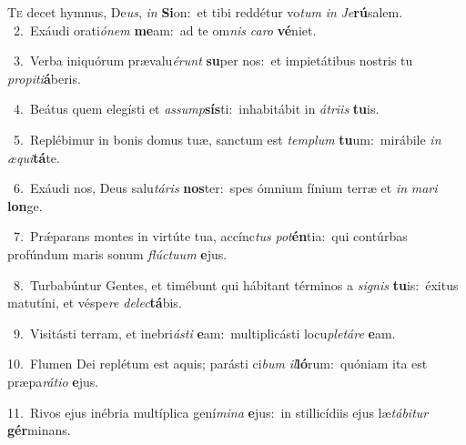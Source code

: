 \lettrine{\initial\textcolor{\initialcolor}{T}}{e} decet hymnus, De\-\textit{us}\-, \textit{in} \textbf{Si}\-on:~\star et tibi reddétur vo\textit{tum} \textit{in} \textit{Je}\-\textbf{rú}salem.\\
{\numbfont\textcolor{\numbcolor}{~2.}}~Exáudi orati\-\textit{ó}\-\textit{nem} \textbf{me}\-am:~\star ad te om\textit{nis} \textit{ca}\-\textit{ro} \textbf{vé}\-niet.\par
{\numbfont\textcolor{\numbcolor}{~3.}}~Verba iniquórum prævalu\-\textit{é}\-\textit{runt} \textbf{su}\-per nos:~\star et impietátibus nostris tu \textit{pro}\-\textit{pi}\textit{ti}\textbf{á}beris.\par
{\numbfont\textcolor{\numbcolor}{~4.}}~Beátus quem elegísti et \textit{as}\-\textit{sump}\textbf{sís}ti:~\star inhabitábit in \textit{á}\-\textit{tri}\textit{is} \textbf{tu}\-is.\par
{\numbfont\textcolor{\numbcolor}{~5.}}~Replébimur in bonis domus tuæ, sanctum est \textit{tem}\-\textit{plum} \textbf{tu}\-um:~\star mirábile \textit{in} \textit{æ}\-\textit{qui}\textbf{tá}te.\par
{\numbfont\textcolor{\numbcolor}{~6.}}~Exáudi nos, Deus salu\-\textit{tá}\-\textit{ris} \textbf{nos}\-ter:~\star spes ómnium fínium terræ et \textit{in} \textit{ma}\-\textit{ri} \textbf{lon}\-ge.\par
{\numbfont\textcolor{\numbcolor}{~7.}}~Prǽparans montes in virtúte tua, accínc\textit{tus} \textit{pot}\-\textbf{én}tia:~\star qui contúrbas profúndum maris sonum \textit{flúc}\-\textit{tu}\textit{um} \textbf{e}\-jus.\par
{\numbfont\textcolor{\numbcolor}{~8.}}~Turbabúntur Gentes, et timébunt qui hábitant términos a \textit{si}\-\textit{gnis} \textbf{tu}\-is:~\star éxitus matutíni, et véspe\textit{re} \textit{de}\-\textit{lec}\textbf{tá}bis.\par
{\numbfont\textcolor{\numbcolor}{~9.}}~Visitásti terram, et inebri\-\textit{ás}\-\textit{ti} \textbf{e}\-am:~\star multiplicásti locu\-\textit{ple}\-\textit{tá}\textit{re} \textbf{e}\-am.\par
{\numbfont\textcolor{\numbcolor}{10.}}~Flumen Dei replétum est aquis; parásti ci\textit{bum} \textit{il}\-\textbf{ló}rum:~\star quóniam ita est præpa\-\textit{rá}\-\textit{ti}\textit{o} \textbf{e}\-jus.\par
{\numbfont\textcolor{\numbcolor}{11.}}~Rivos ejus inébria multíplica gení\-\textit{mi}\-\textit{na} \textbf{e}\-jus:~\star in stillicídiis ejus læ\-\textit{tá}\-\textit{bi}\textit{tur} \textbf{gér}\-minans.\par
